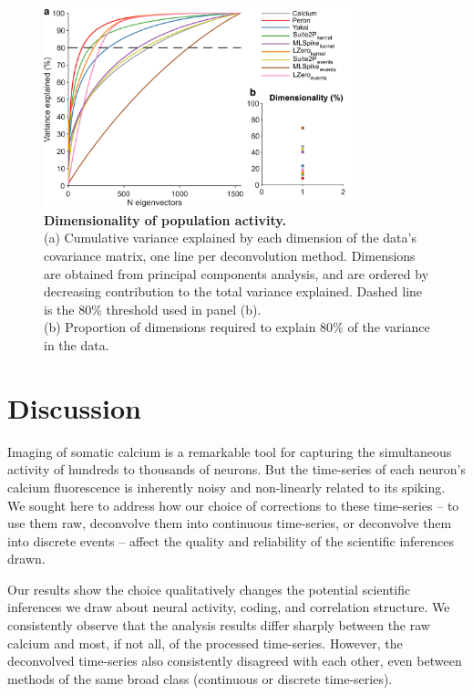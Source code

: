 \documentclass[a4paper,11pt]{article}
\begin{document}
\begin{figure}[h!]
	\centering
\includegraphics[width=0.8\textwidth]{composite_figs/fig8_dimensionality}
\caption{\label{fig:dimensionality} \textbf{Dimensionality of population activity.} \\
(a) Cumulative variance explained by each dimension of the data’s covariance matrix, one line per deconvolution method. Dimensions are obtained from principal components analysis, and are ordered by decreasing contribution to the total variance explained. Dashed line is the 80\% threshold used in panel (b). \\
(b) Proportion of dimensions required to explain 80$\%$ of the variance in the data.}
\end{figure}



\newpage
\section{Discussion}
Imaging of somatic calcium is a remarkable tool for capturing the simultaneous activity of hundreds to thousands of neurons. But the time-series of each neuron's calcium fluorescence is inherently noisy and non-linearly related to its spiking. We sought here to address how our choice of corrections to these time-series -- to use them raw, deconvolve them into continuous time-series, or deconvolve them into discrete events -- affect the quality and reliability of the scientific inferences drawn.

Our results show the choice qualitatively changes the potential scientific inferences we draw about neural activity, coding, and correlation structure. We consistently observe that the analysis results differ sharply between the raw calcium and most, if not all, of the processed time-series. However, the deconvolved time-series also consistently disagreed with each other, even between methods of the same broad class (continuous or discrete time-series). 
\end{document}
